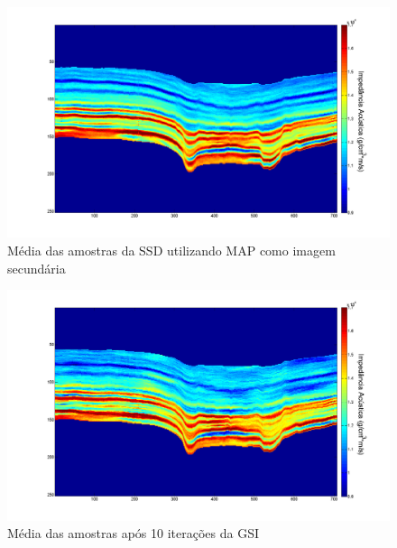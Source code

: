 \begin{figure}[htp]
\begin{center}
  \includegraphics[width=\textwidth]{fig/mapdss1it-20realz-filt}
  \caption{Média das amostras da SSD utilizando MAP como imagem
  secundária}
  \label{fig:mapDSS}
\end{center}
\end{figure}


\begin{figure}[htp]
\begin{center}
  \includegraphics[width=\textwidth]{fig/dss10it-20realz}
  \caption{Média das amostras após 10 iterações da GSI}
  \label{fig:dss10result}
\end{center}
\end{figure}

